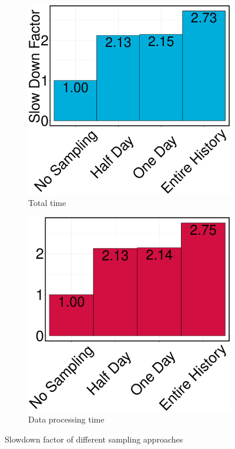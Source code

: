 \begin{figure}[h]
\begin{subfigure}{\columnwidth/2}
\centering
\includegraphics[width=\columnwidth]{../images/experiment-results/criteo-sampling-total-experiment.eps}
\caption{Total time}
\label{fig:sampling-mode-total-time}
\end{subfigure}%
\begin{subfigure}{\columnwidth/2}
\centering
\includegraphics[width=\columnwidth]{../images/experiment-results/criteo-sampling-data-experiment.eps}
\caption{Data processing time}
\label{fig:sampling-mode-data-time}
\end{subfigure}
\vspace{2mm}
\caption{Slowdown factor of different sampling approaches}
\label{fig:sampling-mode-time}
\end{figure}

